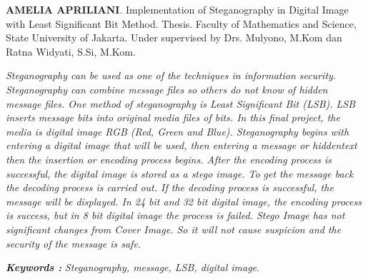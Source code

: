 \documentclass{jtetiskripsi}
\begin{document}
\begin{abstracteng}
\textbf{AMELIA APRILIANI}. Implementation of Steganography in Digital Image with Least Significant Bit Method. Thesis. Faculty of Mathematics and Science, State University of Jakarta. Under supervised by Drs. Mulyono, M.Kom dan Ratna Widyati, S.Si, M.Kom.
\vskip1cm

	\textit{Steganography can be used as one of the techniques in information security. Steganography can combine message files so others do not know of hidden message files. One method of steganography is Least Significant Bit (LSB). LSB inserts message bits into original media files of bits. In this final project, the media is digital image RGB (Red, Green and Blue). Steganography begins with entering a digital image that will be used, then entering a message or hiddentext then the insertion or encoding process begins. After the encoding process is successful, the digital image is stored as a stego image. To get the message back the decoding process is carried out. If the decoding process is successful, the message will be displayed. In 24 bit and 32 bit digital image, the encoding process is success, but in 8 bit digital image the process is failed. Stego Image has not significant changes from Cover Image. So it will not cause suspicion and the security of the message is safe.}    
	
	\bigskip
	\noindent
	\textbf{\emph{Keywords :}} \emph{Steganography, message, LSB, digital image}.
\end{abstracteng}


\tableofcontents 
{}
\listoffigures
{}
\listoftables
{}

\begin{counterpage}
\end{counterpage}



\end{document}
